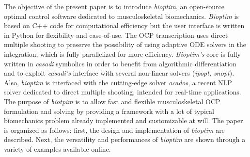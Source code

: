 

The objective of the present paper is to introduce \textit{bioptim}, an open-source optimal control software dedicated to musculoskeletal biomechanics.
\textit{Bioptim} is based on C++ code for computational efficiency but the user interface is written in Python for flexibility and ease-of-use. 
The OCP transcription uses direct multiple shooting to preserve the possibility of using adaptive ODE solvers in the integration, which is fully parallelized for more efficiency.
\textit{Bioptim's} core is fully written in \textit{casadi} symbolics in order to benefit from algorithmic differentiation and to exploit \textit{casadi's} interface with several non-linear solvers (\textit{ipopt, snopt}).
Also, \textit{bioptim} is interfaced with the cutting-edge solver \textit{acados}, a recent NLP solver dedicated to direct multiple shooting, intended for real-time applications.
The purpose of \textit{biotpim} is to allow fast and flexible musculoskeletal OCP formulation and solving by providing a framework with a lot of typical biomechanics problem already implemented and customizable at will.
The paper is organized as follows: first, the design and implementation of \textit{bioptim} are described.
Next, the versatility and performances of \textit{bioptim} are shown through a variety of examples available online. 

